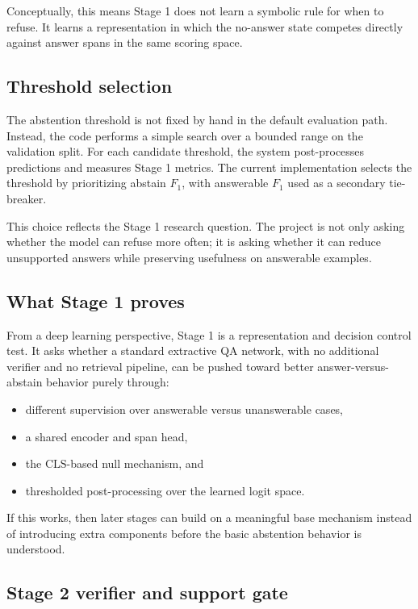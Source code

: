 Conceptually, this means Stage 1 does not learn a symbolic rule for when to
refuse.
It learns a representation in which the no-answer state competes directly
against answer spans in the same scoring space.

\subsection{Threshold selection}

The abstention threshold is not fixed by hand in the default evaluation path.
Instead, the code performs a simple search over a bounded range on the
validation split.
For each candidate threshold, the system post-processes predictions and
measures Stage 1 metrics.
The current implementation selects the threshold by prioritizing abstain
\(F_1\), with answerable \(F_1\) used as a secondary tie-breaker.

This choice reflects the Stage 1 research question.
The project is not only asking whether the model can refuse more often; it is
asking whether it can reduce unsupported answers while preserving usefulness on
answerable examples.

\subsection{What Stage 1 proves}

From a deep learning perspective, Stage 1 is a representation and decision
control test.
It asks whether a standard extractive QA network, with no additional verifier
and no retrieval pipeline, can be pushed toward better answer-versus-abstain
behavior purely through:
\begin{itemize}[leftmargin=1.25em]
  \item different supervision over answerable versus unanswerable cases,
  \item a shared encoder and span head,
  \item the \(\mathrm{CLS}\)-based null mechanism, and
  \item thresholded post-processing over the learned logit space.
\end{itemize}

If this works, then later stages can build on a meaningful base mechanism
instead of introducing extra components before the basic abstention behavior is
understood.

\subsection{Stage 2 verifier and support gate}

